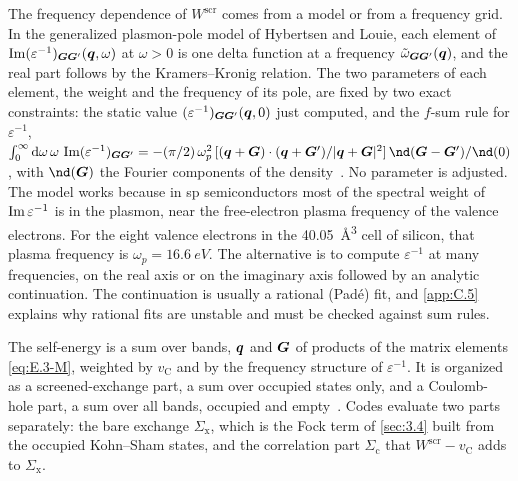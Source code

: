 The frequency dependence of $W^{\mathrm{scr}}$ comes from a model or from a frequency grid. In the generalized plasmon-pole model of Hybertsen and Louie, each element of $\operatorname{Im}(\varepsilon^{-1})_{\bm{G}\bm{G}'}(\bm{q}, \omega)$ at $\omega > 0$ is one delta function at a frequency $\tilde\omega_{\bm{G}\bm{G}'}(\bm{q})$, and the real part follows by the Kramers--Kronig relation. The two parameters of each element, the weight and the frequency of its pole, are fixed by two exact constraints: the static value $(\varepsilon^{-1})_{\bm{G}\bm{G}'}(\bm{q}, 0)$ just computed, and the $f$-sum rule for $\varepsilon^{-1}$, $\int_0^\infty\dd\omega\,\omega\,\Imag(\varepsilon^{-1})_{\vect{G}\vect{G}'} = -(\pi/2)\,\omega_p^2\,[(\vect{q} + \vect{G})\cdot(\vect{q} + \vect{G}')/|\vect{q} + \vect{G}|^2]\,\nd(\vect{G} - \vect{G}')/\nd(0)$, with $\nd(\vect{G})$ the Fourier components of the density~\cite[Eqs.~(83)--(86)]{aryasetiawan1998gw}. No parameter is adjusted. The model works because in sp semiconductors most of the spectral weight of $\operatorname{Im}\varepsilon^{-1}$ is in the plasmon, near the free-electron plasma frequency of the valence electrons. For the eight valence electrons in the \SI{40.05}{\angstrom^3} cell of silicon, that plasma frequency is $\omega_p = \SI{16.6}{eV}$. The alternative is to compute $\varepsilon^{-1}$ at many frequencies, on the real axis or on the imaginary axis followed by an analytic continuation. The continuation is usually a rational (Pad\'e) fit, and \cref{app:C.5} explains why rational fits are unstable and must be checked against sum rules.

The self-energy is a sum over bands, $\bm{q}$ and $\bm{G}$ of products of the matrix elements \cref{eq:E.3-M}, weighted by $v_{\mathrm{C}}$ and by the frequency structure of $\varepsilon^{-1}$. It is organized as a screened-exchange part, a sum over occupied states only, and a Coulomb-hole part, a sum over all bands, occupied and empty~\cite[Eqs.~(19)--(22)]{deslippe2012berkeleygw}. Codes evaluate two parts separately: the bare exchange $\Sigma_{\mathrm{x}}$, which is the Fock term of \cref{sec:3.4} built from the occupied Kohn--Sham states, and the correlation part $\Sigma_{\mathrm{c}}$ that $W^{\mathrm{scr}} - v_{\mathrm{C}}$ adds to $\Sigma_{\mathrm{x}}$.

